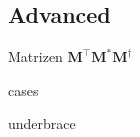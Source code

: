 \subsection{Advanced}

\begin{frame}{Matrizen}
  $\mathbf{M}^\top \mathbf{M}^* \mathbf{M}^\dagger$
\end{frame}

\begin{frame}{cases}
\end{frame}

\begin{frame}{underbrace}
\end{frame}

